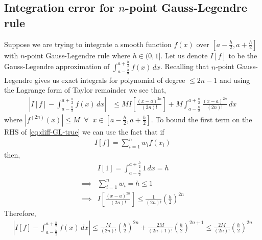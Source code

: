 \subsection{Integration error for $n$-point Gauss-Legendre rule}\label{ssec-error-GL}
Suppose we are trying to integrate a smooth function $f(x)$ over $\left[a-\frac{h}{2}, a+\frac{h}{2}\right]$ with $n$-point Gauss-Legendre rule where $h\in(0, 1]$. Let us denote $I[f]$ to be the Gauss-Legendre approximation of $\int_{a-\frac{h}{2}}^{a+\frac{h}{2}} f(x)\,dx$. Recalling that $n$-point Gauss-Legendre gives us exact integrals for polynomial of degree $\le 2n-1$ and using the Lagrange form of Taylor remainder we see that, 
\begin{align}
    \left|I[f]-\int_{a-\frac{h}{2}}^{a+\frac{h}{2}} f(x)\,dx\right| &\le MI\left[\frac{(x-a)^{2n}}{(2n)!}\right]+M\int_{a-\frac{h}{2}}^{a+\frac{h}{2}} \frac{(x-a)^{2n}}{(2n)!}\,dx\label{eq:diff-GL-true}
\end{align}
where $|f^{(2n)}(x)|\le M\;\;\forall\;\;x\in\left[a-\frac{h}{2}, a+\frac{h}{2}\right]$. To bound the first term on the RHS of \eqref{eq:diff-GL-true} we can use the fact that if 
\begin{align}
    I[f] = \sum_{i=1}^nw_if(x_i)
\end{align}
then,
\begin{align}
    &I[1] = \int_{a-\frac{h}{2}}^{a+\frac{h}{2}} 1 \,dx = h\\
    \implies&\sum_{i=1}^nw_i = h\le1\\
    \implies&I\left[\frac{(x-a)^{2n}}{(2n)!}\right]\le\frac{1}{(2n)!}\left(\frac{h}{2}\right)^{2n}
\end{align}
Therefore,
\begin{align}
    \left|I[f]-\int_{a-\frac{h}{2}}^{a+\frac{h}{2}} f(x)\,dx\right|\le \frac{M}{(2n)!}\left(\frac{h}{2}\right)^{2n}+\frac{2M}{(2n+1)!}\left(\frac{h}{2}\right)^{2n+1}\le\frac{2M}{(2n)!}\left(\frac{h}{2}\right)^{2n}
\end{align}
 